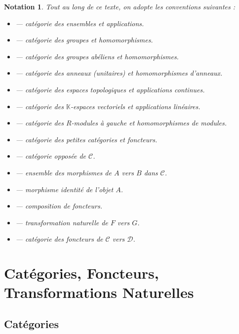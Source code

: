 \documentclass[a4paper,12pt]{book}
\DeclareMathOperator{\Hom}{Hom}
\DeclareMathOperator{\Set}{\mathbf{Set}}
\DeclareMathOperator{\Grp}{\mathbf{Grp}}
\DeclareMathOperator{\Ab}{\mathbf{Ab}}
\DeclareMathOperator{\Ring}{\mathbf{Ring}}
\DeclareMathOperator{\Top}{\mathbf{Top}}
\DeclareMathOperator{\Vect}{\mathbf{Vect}}
\DeclareMathOperator{\Mod}{\mathbf{Mod}}
\DeclareMathOperator{\Cat}{\mathbf{Cat}}
\newcommand{\op}{\mathrm{op}}
\newcommand{\id}{\mathrm{id}}
\newcommand{\K}{\mathbb{K}}
\newtheorem*{notation}{Notation}
\begin{document}
\begin{notation}
Tout au long de ce texte, on adopte les conventions suivantes :
\begin{itemize}[leftmargin=2cm]
  \item[$\Set$] --- catégorie des ensembles et applications.
  \item[$\Grp$] --- catégorie des groupes et homomorphismes.
  \item[$\Ab$] --- catégorie des groupes abéliens et homomorphismes.
  \item[$\Ring$] --- catégorie des anneaux (unitaires) et homomorphismes d'anneaux.
  \item[$\Top$] --- catégorie des espaces topologiques et applications continues.
  \item[$\Vect_\K$] --- catégorie des $\K$-espaces vectoriels et applications linéaires.
  \item[$R\text{-}\Mod$] --- catégorie des $R$-modules à gauche et homomorphismes de modules.
  \item[$\Cat$] --- catégorie des petites catégories et foncteurs.
  \item[$\mathcal{C}^{\op}$] --- catégorie opposée de $\mathcal{C}$.
  \item[$\Hom_{\mathcal{C}}(A,B)$] --- ensemble des morphismes de $A$ vers $B$ dans $\mathcal{C}$.
  \item[$\id_A$] --- morphisme identité de l'objet $A$.
  \item[$F \circ G$] --- composition de foncteurs.
  \item[$\alpha : F \Rightarrow G$] --- transformation naturelle de $F$ vers $G$.
  \item[{$[\mathcal{C}, \mathcal{D}]$}] --- catégorie des foncteurs de $\mathcal{C}$ vers $\mathcal{D}$.
\end{itemize}
\end{notation}

\chapter{Catégories, Foncteurs, Transformations Naturelles}
\minitoc

\section{Catégories}
\end{document}
